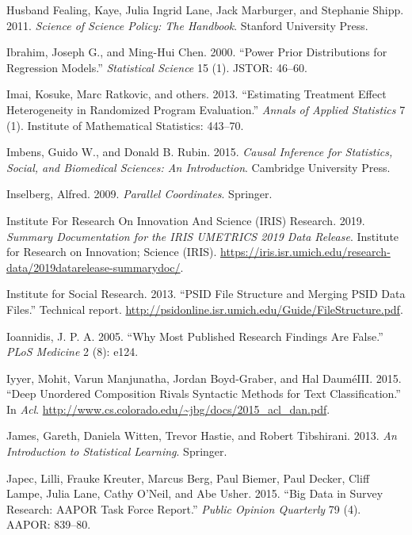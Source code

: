 \documentclass[]{krantz}
\begin{document}
\hypertarget{ref-husband2011science}{}
Husband Fealing, Kaye, Julia Ingrid Lane, Jack Marburger, and Stephanie
Shipp. 2011. \emph{Science of Science Policy: The Handbook}. Stanford
University Press.

\hypertarget{ref-ibrahim2000power}{}
Ibrahim, Joseph G., and Ming-Hui Chen. 2000. ``Power Prior Distributions
for Regression Models.'' \emph{Statistical Science} 15 (1). JSTOR:
46--60.

\hypertarget{ref-imai2013estimating}{}
Imai, Kosuke, Marc Ratkovic, and others. 2013. ``Estimating Treatment
Effect Heterogeneity in Randomized Program Evaluation.'' \emph{Annals of
Applied Statistics} 7 (1). Institute of Mathematical Statistics:
443--70.

\hypertarget{ref-imbens2015causal}{}
Imbens, Guido W., and Donald B. Rubin. 2015. \emph{Causal Inference for
Statistics, Social, and Biomedical Sciences: An Introduction}. Cambridge
University Press.

\hypertarget{ref-inselberg2009}{}
Inselberg, Alfred. 2009. \emph{Parallel Coordinates}. Springer.

\hypertarget{ref-InstituteForResearchOnInnovationAndScienceIRISResearch2019}{}
Institute For Research On Innovation And Science (IRIS) Research. 2019.
\emph{Summary Documentation for the IRIS UMETRICS 2019 Data Release}.
Institute for Research on Innovation; Science (IRIS).
\url{https://iris.isr.umich.edu/research-data/2019datarelease-summarydoc/}.

\hypertarget{ref-PSIDguide}{}
Institute for Social Research. 2013. ``PSID File Structure and Merging
PSID Data Files.'' Technical report.
\url{http://psidonline.isr.umich.edu/Guide/FileStructure.pdf}.

\hypertarget{ref-Ioannidis2005}{}
Ioannidis, J. P. A. 2005. ``Why Most Published Research Findings Are
False.'' \emph{PLoS Medicine} 2 (8): e124.

\hypertarget{ref-iyyer-15}{}
Iyyer, Mohit, Varun Manjunatha, Jordan Boyd-Graber, and Hal DauméIII.
2015. ``Deep Unordered Composition Rivals Syntactic Methods for Text
Classification.'' In \emph{Acl}.
\url{http://www.cs.colorado.edu/~jbg/docs/2015_acl_dan.pdf}.

\hypertarget{ref-james2013introduction}{}
James, Gareth, Daniela Witten, Trevor Hastie, and Robert Tibshirani.
2013. \emph{An Introduction to Statistical Learning}. Springer.

\hypertarget{ref-japec2015big}{}
Japec, Lilli, Frauke Kreuter, Marcus Berg, Paul Biemer, Paul Decker,
Cliff Lampe, Julia Lane, Cathy O'Neil, and Abe Usher. 2015. ``Big Data
in Survey Research: AAPOR Task Force Report.'' \emph{Public Opinion
Quarterly} 79 (4). AAPOR: 839--80.
\end{document}
